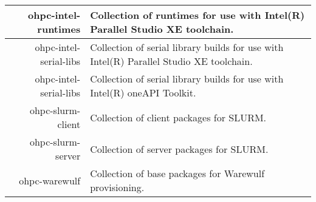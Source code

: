\begin{tabularx}{\textwidth}{r|X}
\hline
ohpc-intel-runtimes & Collection of runtimes for use with Intel(R) Parallel Studio XE toolchain. \\
\hline
ohpc-intel-serial-libs & Collection of serial library builds for use with Intel(R) Parallel Studio XE toolchain. \\
\hline
ohpc-intel-serial-libs & Collection of serial library builds for use with Intel(R) oneAPI Toolkit. \\
\hline
ohpc-slurm-client & Collection of client packages for SLURM. \\
\hline
ohpc-slurm-server & Collection of server packages for SLURM. \\
\hline
ohpc-warewulf & Collection of base packages for Warewulf provisioning. \\
\hline
\bottomrule
\end{tabularx}
